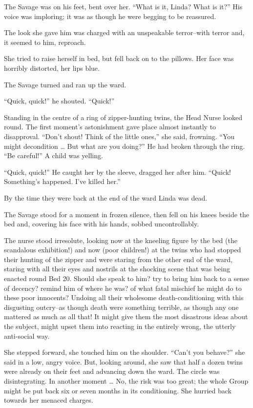 \documentclass[12pt]{report}
\begin{document}
The Savage was on his feet, bent over her. ``What is it, Linda? What is
it?'' His voice was imploring; it was as though he were begging to be
reassured.

The look she gave him was charged with an unspeakable terror--with
terror and, it seemed to him, reproach.

She tried to raise herself in bed, but fell back on to the pillows. Her
face was horribly distorted, her lips blue.

The Savage turned and ran up the ward.

``Quick, quick!'' he shouted. ``Quick!''

Standing in the centre of a ring of zipper-hunting twins, the Head Nurse
looked round. The first moment's astonishment gave place almost
instantly to disapproval. ``Don't shout! Think of the little ones,'' she
said, frowning. ``You might decondition \ldots{} But what are you
doing?'' He had broken through the ring. ``Be careful!'' A child was
yelling.

``Quick, quick!'' He caught her by the sleeve, dragged her after him.
``Quick! Something's happened. I've killed her.''

By the time they were back at the end of the ward Linda was dead.

The Savage stood for a moment in frozen silence, then fell on his knees
beside the bed and, covering his face with his hands, sobbed
uncontrollably.

The nurse stood irresolute, looking now at the kneeling figure by the
bed (the scandalous exhibition!) and now (poor children!) at the twins
who had stopped their hunting of the zipper and were staring from the
other end of the ward, staring with all their eyes and nostrils at the
shocking scene that was being enacted round Bed 20. Should she speak to
him? try to bring him back to a sense of decency? remind him of where he
was? of what fatal mischief he might do to these poor innocents? Undoing
all their wholesome death-conditioning with this disgusting outcry--as
though death were something terrible, as though any one mattered as much
as all that! It might give them the most disastrous ideas about the
subject, might upset them into reacting in the entirely wrong, the
utterly anti-social way.

She stepped forward, she touched him on the shoulder. ``Can't you
behave?'' she said in a low, angry voice. But, looking around, she saw
that half a dozen twins were already on their feet and advancing down
the ward. The circle was disintegrating. In another moment \ldots{} No,
the risk was too great; the whole Group might be put back six or seven
months in its conditioning. She hurried back towards her menaced
charges.
\end{document}
